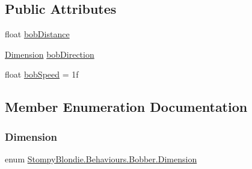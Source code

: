 \subsection*{Public Attributes}
\begin{DoxyCompactItemize}
\item 
float \mbox{\hyperlink{class_stompy_blondie_1_1_behaviours_1_1_bobber_af19a43e9b4c27a9f051cb9a2752170b4}{bob\+Distance}}
\item 
\mbox{\hyperlink{class_stompy_blondie_1_1_behaviours_1_1_bobber_aa5824e905d1992e924d9755659a7717e}{Dimension}} \mbox{\hyperlink{class_stompy_blondie_1_1_behaviours_1_1_bobber_a09bd3f72a7af5f83f2c6f6cdd35aeefa}{bob\+Direction}}
\item 
float \mbox{\hyperlink{class_stompy_blondie_1_1_behaviours_1_1_bobber_a70dd7d7f45370459a859ee2c86d5cf9f}{bob\+Speed}} = 1f
\end{DoxyCompactItemize}


\subsection{Member Enumeration Documentation}
\mbox{\label{class_stompy_blondie_1_1_behaviours_1_1_bobber_aa5824e905d1992e924d9755659a7717e}} 
\subsubsection{\texorpdfstring{Dimension}{Dimension}}
{\footnotesize\ttfamily enum \mbox{\hyperlink{class_stompy_blondie_1_1_behaviours_1_1_bobber_aa5824e905d1992e924d9755659a7717e}{Stompy\+Blondie.\+Behaviours.\+Bobber.\+Dimension}}\hspace{0.3cm}{\ttfamily [strong]}}

